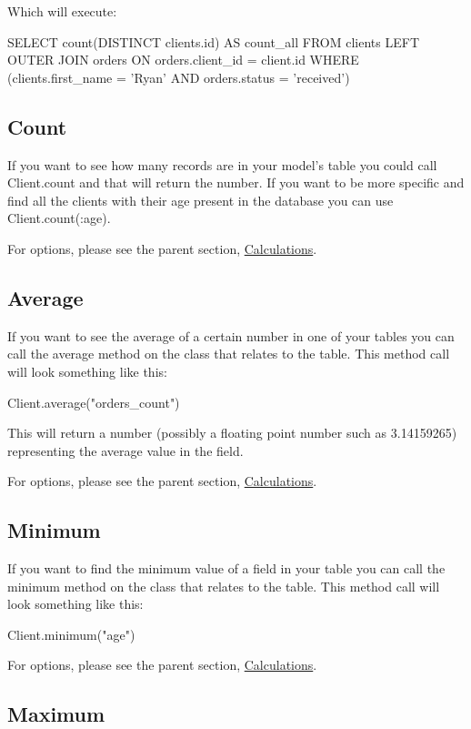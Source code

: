 \documentclass[10pt]{book}
\newenvironment{code}{%
  \scriptsize
    \verbatim
}{%
    \endverbatim
    \newline
}
\begin{document}
Which will execute:
\begin{code}
SELECT count(DISTINCT clients.id) AS count_all FROM clients
  LEFT OUTER JOIN orders ON orders.client_id = client.id WHERE
  (clients.first_name = 'Ryan' AND orders.status = 'received')
\end{code}

\subsection{ Count}

If you want to see how many records are in your model’s table you could call Client.count  and that will return the number. If you want to be more specific and  find all the clients with their age present in the database you can use Client.count(:age).

For options, please see the parent section, \hyperlink{calculations}{Calculations}.

\subsection{ Average}

If you want to see the average of a certain number in one of your tables you can call the average method on the class that relates to the table. This method call will look something like this:
\begin{code}
Client.average("orders_count")
\end{code}

This will return a number (possibly a floating point number such as 3.14159265) representing the average value in the field.

For options, please see the parent section, \hyperlink{calculations}{Calculations}.

\subsection{ Minimum}

If you want to find the minimum value of a field in your table you can call the minimum method on the class that relates to the table. This method call will look something like this:
\begin{code}
Client.minimum("age")
\end{code}

For options, please see the parent section, \hyperlink{calculations}{Calculations}.

\subsection{ Maximum}
\end{document}
